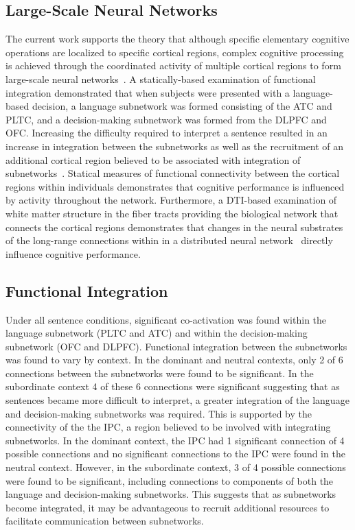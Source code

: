 \subsection{Large-Scale Neural Networks}
The current work supports the theory that although specific elementary cognitive operations are localized to specific cortical regions, complex cognitive processing is achieved through the coordinated activity of multiple cortical regions to form large-scale neural networks~\cite{Mesulam1990}. A statically-based examination of functional integration demonstrated that when subjects were presented with a language-based decision, a language subnetwork was formed consisting of the ATC and PLTC, and a decision-making subnetwork was formed from the DLPFC and OFC. Increasing the difficulty required to interpret a sentence resulted in an increase in integration between the subnetworks as well as the recruitment of an additional cortical region believed to be associated with integration of subnetworks~\cite{Jaencke2001,Assmus2003}. Statical measures of functional connectivity between the cortical regions within individuals demonstrates that cognitive performance is influenced by activity throughout the network. Furthermore, a DTI-based examination of white matter structure in the fiber tracts providing the biological network that connects the cortical regions demonstrates that changes in the neural substrates of the long-range connections within in a distributed neural network~\cite{Sporns2004} directly influence cognitive performance. 

\subsection{Functional Integration}
Under all sentence conditions, significant co-activation was found within the language subnetwork (PLTC and ATC) and within the decision-making subnetwork (OFC and DLPFC). Functional integration between the subnetworks was found to vary by context. In the dominant and neutral contexts, only 2 of 6 connections between the subnetworks were found to be significant. In the subordinate context 4 of these 6 connections were significant suggesting that as sentences became more difficult to interpret, a greater integration of the language and decision-making subnetworks was required. This is supported by the connectivity of the the IPC, a region believed to be involved with integrating subnetworks. In the dominant context, the IPC had 1 significant connection of 4 possible connections and no significant connections to the IPC were found in the neutral context. However, in the subordinate context, 3 of 4 possible connections were found to be significant, including connections to components of both the language and decision-making subnetworks. This suggests that as subnetworks become integrated, it may be advantageous to recruit additional resources to facilitate communication between subnetworks.

